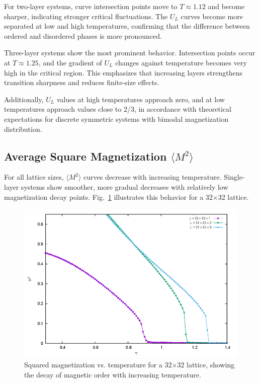 \documentclass[conference, compsoc, twoside]{IEEEtran}
\begin{document}
For two-layer systems, curve intersection points move to $T \approx 1.12$ and become sharper, indicating stronger critical fluctuations. The $U_L$ curves become more separated at low and high temperatures, confirming that the difference between ordered and disordered phases is more pronounced.

Three-layer systems show the most prominent behavior. Intersection points occur at $T \approx 1.25$, and the gradient of $U_L$ changes against temperature becomes very high in the critical region. This emphasizes that increasing layers strengthens transition sharpness and reduces finite-size effects.

Additionally, $U_L$ values at high temperatures approach zero, and at low temperatures approach values close to 2/3, in accordance with theoretical expectations for discrete symmetric systems with bimodal magnetization distribution.

\subsection{Average Square Magnetization $\langle M^2 \rangle$}

For all lattice sizes, $\langle M^2 \rangle$ curves decrease with increasing temperature. Single-layer systems show smoother, more gradual decreases with relatively low magnetization decay points. Fig.~\ref{fig:m2_32x32} illustrates this behavior for a 32×32 lattice.

\begin{figure}[t]
    \centering
    \includegraphics[width=0.9\columnwidth]{Gambar 25. M^2 vs T pada Kisi 32x32.png}
    \caption{Squared magnetization vs. temperature for a 32×32 lattice, showing the decay of magnetic order with increasing temperature.}
    \label{fig:m2_32x32}
\end{figure}
\end{document}
